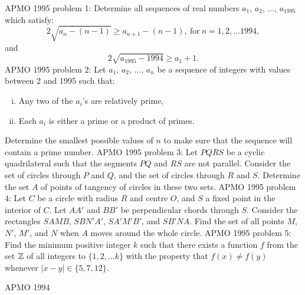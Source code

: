 APMO 1995 problem 1:  Determine all sequences of real numbers $a_1$, $a_2$, $\ldots$, $a_{1995}$ which satisfy:
\[ 2\sqrt{a_n - (n - 1)} \geq a_{n+1} - (n - 1), \ \mbox{for} \ n = 1, 2, \ldots 1994, \]
and
\[ 2\sqrt{a_{1995} - 1994} \geq a_1 + 1. \] 
APMO 1995 problem 2:  Let $a_1$, $a_2$, $\ldots$, $a_n$ be a sequence of integers with values between 2 and 1995 such that:
\begin{enumerate}[(i)]
  \item Any two of the $a_i$'s are relatively prime,
  \item Each $a_i$ is either a prime or a product of primes.
\end{enumerate}
Determine the smallest possible values of $n$ to make sure that the sequence will contain a prime number. 
APMO 1995 problem 3:  Let $PQRS$ be a cyclic quadrilateral such that the segments $PQ$ and $RS$ are not parallel.  Consider the set of circles through $P$ and $Q$, and the set of circles through $R$ and $S$.  Determine the set $A$ of points of tangency of circles in these two sets. 
APMO 1995 problem 4:  Let $C$ be a circle with radius $R$ and centre $O$, and $S$ a fixed point in the interior of $C$.  Let $AA'$ and $BB'$ be perpendicular chords through $S$. Consider the rectangles $SAMB$, $SBN'A'$, $SA'M'B'$, and $SB'NA$.  Find the set of all points $M$, $N'$, $M'$, and $N$ when $A$ moves around the whole circle. 
APMO 1995 problem 5:  Find the minimum positive integer $k$ such that there exists a function $f$ from the set $\Bbb{Z}$ of all integers to $\{1, 2, \ldots k\}$ with the property that $f(x) \neq f(y)$ whenever $|x-y| \in \{5, 7, 12\}$. 

APMO 1994 

